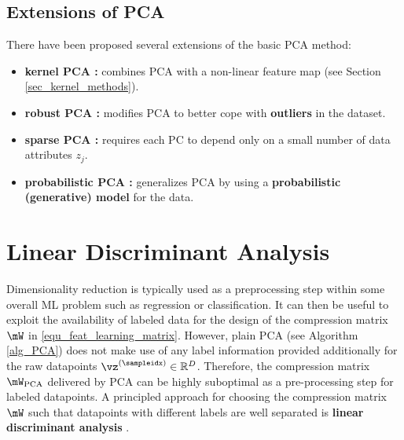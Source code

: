 \documentclass[12pt]{report}
\begin{document}
\subsection{Extensions of PCA}
There have been proposed several extensions of the basic PCA method: 
\begin{itemize}
 \item {\bf kernel PCA \cite[Ch.14.5.4]{hastie01statisticallearning}:} combines PCA with a non-linear feature map (see Section \ref{sec_kernel_methods}). %
 \vspace*{2mm}
 \item {\bf robust PCA \cite{RobustPCA}:} modifies PCA to better cope with {\bf outliers} in the dataset.
 \vspace*{2mm}
 \item {\bf sparse PCA \cite[Ch.14.5.5]{hastie01statisticallearning}:} requires each PC to depend only on a small number of data attributes $z_{j}$. 
 \vspace*{2mm}
 \item {\bf probabilistic PCA \cite{Roweis98emalgorithms,probabilistic-principal-component-analysis}:} generalizes PCA by using a  {\bf probabilistic (generative) model} for the data. 
\end{itemize}

\section{Linear Discriminant Analysis}

Dimensionality reduction is typically used as a preprocessing step within some overall ML problem such as 
regression or classification. It can then be useful to exploit the availability of labeled data for the design 
of the compression matrix $\mW$ in \eqref{equ_feat_learning_matrix}. However, plain PCA (see Algorithm 
\ref{alg_PCA}) does not make use of any label information provided additionally for the raw datapoints 
$\vz^{(\sampleidx)} \in \mathbb{R}^{D}$. Therefore, the compression matrix $\mW_{\rm PCA}$ delivered 
by PCA can be highly suboptimal as a pre-processing step for labeled datapoints. A principled approach 
for choosing the compression matrix $\mW$ such that datapoints with different labels are well separated 
is {\bf linear discriminant analysis} \cite{hastie01statisticallearning}. 
\end{document}
